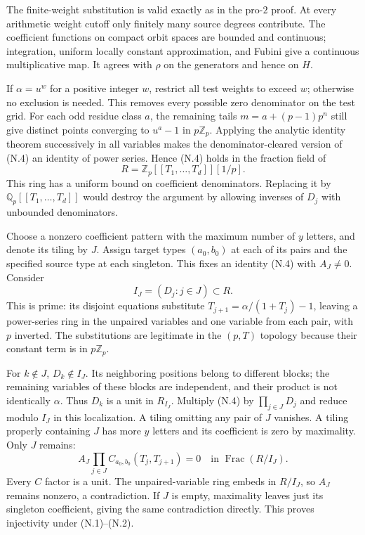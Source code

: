 The finite-weight substitution is valid exactly as in the pro-$2$ proof. At every arithmetic weight cutoff only finitely many source degrees contribute. The coefficient functions on compact orbit spaces are bounded and continuous; integration, uniform locally constant approximation, and Fubini give a continuous multiplicative map. It agrees with $\rho$ on the generators and hence on $H$.

If $\alpha=u^w$ for a positive integer $w$, restrict all test weights to exceed $w$; otherwise no exclusion is needed. This removes every possible zero denominator on the test grid. For each odd residue class $a$, the remaining tails $m=a+(p-1)p^n$ still give distinct points converging to $u^a-1$ in $p\mathbb Z_p$. Applying the analytic identity theorem successively in all variables makes the denominator-cleared version of (N.4) an identity of power series. Hence (N.4) holds in the fraction field of
\[
 R=\mathbb Z_p[[T_1,\ldots,T_d]][1/p].
\]
This ring has a uniform bound on coefficient denominators. Replacing it by $\mathbb Q_p[[T_1,\ldots,T_d]]$ would destroy the argument by allowing inverses of $D_j$ with unbounded denominators.

Choose a nonzero coefficient pattern with the maximum number of $y$ letters, and denote its tiling by $J$. Assign target types $(a_0,b_0)$ at each of its pairs and the specified source type at each singleton. This fixes an identity (N.4) with $A_J\ne0$. Consider
\[
 I_J=(D_j:j\in J)\subset R.
\]
This is prime: its disjoint equations substitute $T_{j+1}=\alpha/(1+T_j)-1$, leaving a power-series ring in the unpaired variables and one variable from each pair, with $p$ inverted. The substitutions are legitimate in the $(p,T)$ topology because their constant term is in $p\mathbb Z_p$.

For $k\notin J$, $D_k\notin I_J$. Its neighboring positions belong to different blocks; the remaining variables of these blocks are independent, and their product is not identically $\alpha$. Thus $D_k$ is a unit in $R_{I_J}$. Multiply (N.4) by $\prod_{j\in J}D_j$ and reduce modulo $I_J$ in this localization. A tiling omitting any pair of $J$ vanishes. A tiling properly containing $J$ has more $y$ letters and its coefficient is zero by maximality. Only $J$ remains:
\[
 A_J\prod_{j\in J}C_{a_0,b_0}(T_j,T_{j+1})=0
 \quad\text{in }\operatorname{Frac}(R/I_J).
\]
Every $C$ factor is a unit. The unpaired-variable ring embeds in $R/I_J$, so $A_J$ remains nonzero, a contradiction. If $J$ is empty, maximality leaves just its singleton coefficient, giving the same contradiction directly. This proves injectivity under (N.1)--(N.2).

